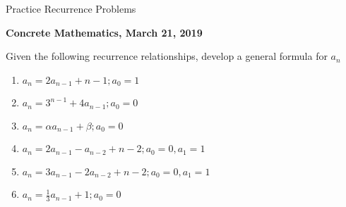 \documentclass[12pt,twosided]{article}
\begin{document}
\thispagestyle{plain}  %

\noindent
    {\Huge Practice Recurrence Problems}
    
    \vspace{1em}
    
    \noindent
        {\Large \bf Concrete Mathematics, March 21, 2019}

\noindent\newline Given the following recurrence relationships, develop a general formula for $a_n$

\begin{enumerate}
	\item $a_n = 2a_{n-1} + n - 1; a_0 = 1$
	
	\item $a_n = 3^{n-1} + 4a_{n-1}; a_0 = 0$
	
	\item $a_n = \alpha a_{n-1} + \beta ; a_0 = 0$

	
	\item $a_n = 2a_{n-1} - a_{n-2} + n-2; a_0 = 0, a_1 = 1$
	
	\item $a_n = 3a_{n-1} - 2a_{n-2} + n-2; a_0 = 0, a_1 = 1$
	
	\item $a_n = \frac{1}{3} a_{n-1} + 1 ; a_0 = 0$
	

\end{enumerate}
\end{document}
